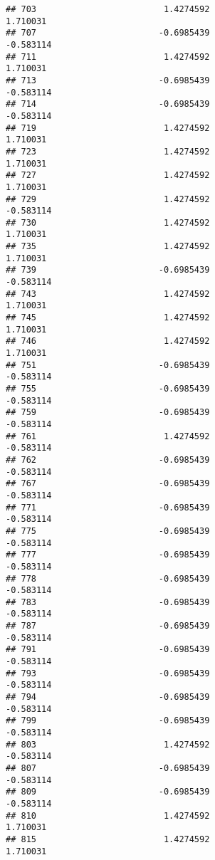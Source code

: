 \documentclass[
]{article}
\begin{document}
\begin{verbatim}
## 703                         1.4274592                         1.710031
## 707                        -0.6985439                        -0.583114
## 711                         1.4274592                         1.710031
## 713                        -0.6985439                        -0.583114
## 714                        -0.6985439                        -0.583114
## 719                         1.4274592                         1.710031
## 723                         1.4274592                         1.710031
## 727                         1.4274592                         1.710031
## 729                         1.4274592                        -0.583114
## 730                         1.4274592                         1.710031
## 735                         1.4274592                         1.710031
## 739                        -0.6985439                        -0.583114
## 743                         1.4274592                         1.710031
## 745                         1.4274592                         1.710031
## 746                         1.4274592                         1.710031
## 751                        -0.6985439                        -0.583114
## 755                        -0.6985439                        -0.583114
## 759                        -0.6985439                        -0.583114
## 761                         1.4274592                        -0.583114
## 762                        -0.6985439                        -0.583114
## 767                        -0.6985439                        -0.583114
## 771                        -0.6985439                        -0.583114
## 775                        -0.6985439                        -0.583114
## 777                        -0.6985439                        -0.583114
## 778                        -0.6985439                        -0.583114
## 783                        -0.6985439                        -0.583114
## 787                        -0.6985439                        -0.583114
## 791                        -0.6985439                        -0.583114
## 793                        -0.6985439                        -0.583114
## 794                        -0.6985439                        -0.583114
## 799                        -0.6985439                        -0.583114
## 803                         1.4274592                        -0.583114
## 807                        -0.6985439                        -0.583114
## 809                        -0.6985439                        -0.583114
## 810                         1.4274592                         1.710031
## 815                         1.4274592                         1.710031

\end{verbatim}
\end{document}
